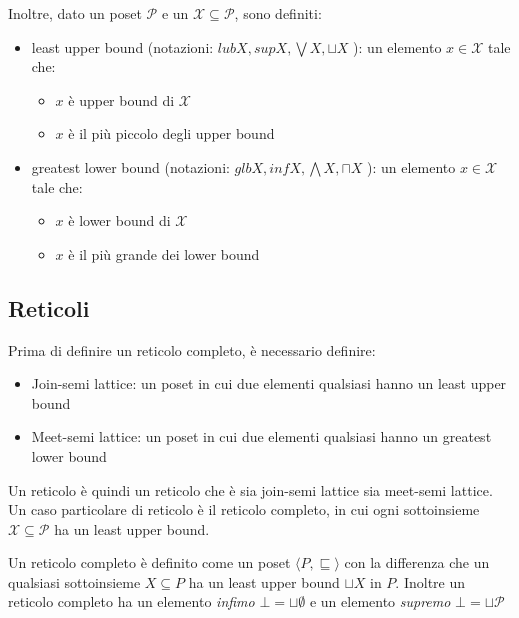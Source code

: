 \documentclass[a4paper, 10pt]{article}
\begin{document}
	\noindent
	Inoltre, dato un poset $\mathcal{P}$ e un $\mathcal{X} \subseteq \mathcal{P}$, sono definiti:
	\begin{itemize}
		\item least upper bound (notazioni: $ lubX, supX, \bigvee X, \sqcup X $ ): un elemento $x \in \mathcal{X}$ tale che:
		\begin{itemize}
			\item $x$ è upper bound di $\mathcal{X}$
			\item $x$ è il più piccolo degli upper bound
		\end{itemize}
		\item greatest lower bound (notazioni: $ glbX, infX, \bigwedge X, \sqcap X $ ): un elemento $x \in \mathcal{X}$ tale che:
		\begin{itemize}
			\item $x$ è lower bound di $\mathcal{X}$
			\item $x$ è il più grande dei lower bound
		\end{itemize}
	\end{itemize}
	
	\subsection{Reticoli}
	Prima di definire un reticolo completo, è necessario definire:
	\begin{itemize}
		\item Join-semi lattice: un poset in cui due elementi qualsiasi hanno un least upper bound
		\item Meet-semi lattice: un poset in cui due elementi qualsiasi hanno un greatest lower bound
	\end{itemize}
	
	Un reticolo è quindi un reticolo che è sia join-semi lattice sia meet-semi lattice. Un caso particolare di reticolo è il reticolo completo, in cui ogni sottoinsieme $\mathcal{X} \subseteq \mathcal{P}$ ha un least upper bound.
	
	Un reticolo completo è definito come un poset $\langle P, \sqsubseteq \rangle$ con la differenza che un qualsiasi sottoinsieme $X \subseteq P$ ha un least upper bound $\sqcup X$ in $P$. Inoltre un reticolo completo ha un elemento \textit{infimo} $\bot = \sqcup \emptyset$ e un elemento \textit{supremo} $\bot = \sqcup \mathcal{P}$
	
\end{document}
